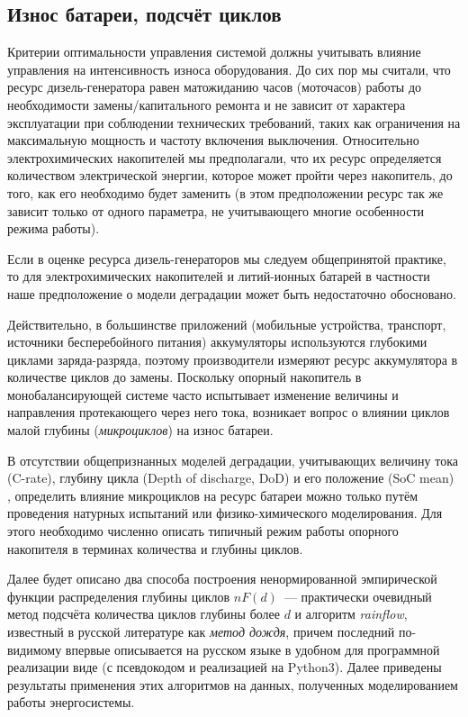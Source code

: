 \subsection{Износ батареи, подсчёт циклов}

Критерии оптимальности управления системой должны учитывать влияние управления на интенсивность износа оборудования.
До сих пор мы считали, что ресурс дизель-генератора равен матожиданию часов (моточасов) работы до необходимости замены/капитального ремонта и не зависит от характера эксплуатации при соблюдении технических требований, таких как ограничения на максимальную мощность и частоту включения выключения.
Относительно электрохимических накопителей мы предполагали, что их ресурс определяется количеством электрической энергии, которое может пройти через накопитель, до того, как его необходимо будет заменить (в этом предположении ресурс так же зависит только от одного параметра, не учитывающего многие особенности режима работы).

Если в оценке ресурса дизель-генераторов мы следуем общепринятой практике, то для электрохимических накопителей и литий-ионных батарей в частности наше предположение о модели деградации может быть недостаточно обосновано.

Действительно, в большинстве приложений (мобильные устройства, транспорт, источники бесперебойного питания) аккумуляторы используются глубокими циклами заряда-разряда, поэтому производители измеряют ресурс аккумулятора в количестве циклов до замены. 
Поскольку опорный накопитель в монобалансирующей системе часто испытывает изменение величины и направления протекающего через него тока, возникает вопрос о влиянии циклов малой глубины (\textit{микроциклов}) на износ батареи.

В отсутствии общепризнанных моделей деградации, учитывающих величину тока (C-rate), глубину цикла (Depth of discharge, DoD) и его положение (SoC mean) \cite{laresgoiti2015modeling}, определить влияние микроциклов на ресурс батареи можно только путём проведения натурных испытаний или физико-химического моделирования. 
Для этого необходимо численно описать типичный режим работы опорного накопителя в терминах количества и глубины циклов.

Далее будет описано два способа построения ненормированной эмпирической функции распределения глубины циклов $nF(d)$~--- практически очевидный метод подсчёта количества циклов глубины более $d$ и алгоритм \textit{rainflow}, известный в русской литературе как \textit{метод дождя}, причем последний по-видимому впервые описывается на русском языке в удобном для программной реализации виде (с псевдокодом и реализацией на Python3).
Далее приведены результаты применения этих алгоритмов на данных, полученных моделированием работы энергосистемы.

